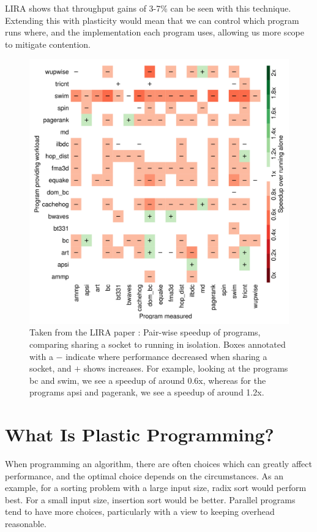 LIRA \cite{lira} shows that throughput gains of 3-7\% can be seen with this technique. Extending this with plasticity would mean that we can control which program runs where, and the implementation each program uses, allowing us more scope to mitigate contention.

\begin{figure}[H]
	\includegraphics[width=\textwidth]{graphics/lira_pairwise_speedup.png}
	\caption{Taken from the LIRA paper \cite{lira}: Pair-wise speedup of programs, comparing sharing a socket to running in isolation. Boxes annotated with a $-$ indicate where performance decreased when sharing a socket, and $+$ shows increases. For example, looking at the programs bc and swim, we see a speedup of around 0.6x, whereas for the programs apsi and pagerank, we see a speedup of around 1.2x.}
	\label{fig:lira_pairwise_speedup}
\end{figure}





\section{What Is Plastic Programming?}
\label{section:background:what_is_plastic_programming}

When programming an algorithm, there are often choices which can greatly affect performance, and the optimal choice depends on the circumstances. As an example, for a sorting problem with a large input size, radix sort would perform best. For a small input size, insertion sort would be better. Parallel programs tend to have more choices, particularly with a view to keeping overhead reasonable.

